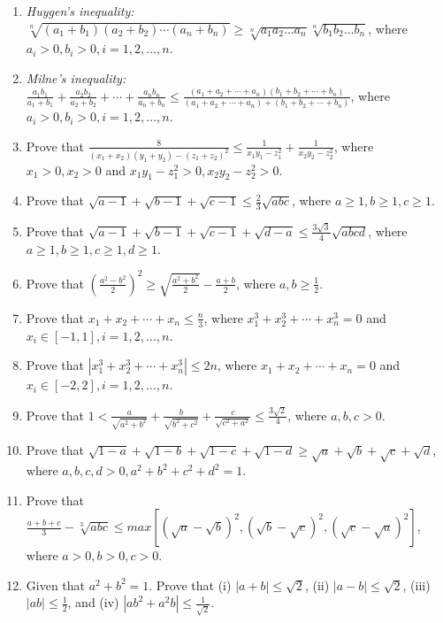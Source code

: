 \begin{enumerate}
\item \textit{Huygen's inequality:} $\sqrt[n]{(a_1 + b_1)(a_2 + b_2)\cdots(a_n + b_n)}\geq \sqrt[n]{a_1a_2\ldots
  a_n}\sqrt[n]{b_1b_2\ldots b_n}$, where $a_i > 0, b_i > 0, i = 1, 2, \ldots, n$.
\item \textit{Milne's inequality:} $\frac{a_1b_1}{a_1 + b_1} + \frac{a_2b_2}{a_2 + b_2} + \cdots + \frac{a_nb_n}{a_n + b_n}\leq
  \frac{(a_1 + a_2 + \cdots + a_n)(b_1 + b_2 + \cdots + b_n)}{(a_1 + a_2 + \cdots + a_n) + (b_1 + b_2 + \cdots + b_n)}$, where $a_i
  > 0, b_i > 0, i = 1, 2, \ldots, n$.
\item Prove that $\frac{8}{(x_1 + x_2)(y_1 + y_2) - (z_1 + z_2)^2} \leq \frac{1}{x_1y_1 - z_1^2} + \frac{1}{x_2y_2 - z_2^2}$, where
  $x_1 > 0, x_2 > 0$ and $x_1y_1 - z_1^2 > 0, x_2y_2 - z_2^2 > 0$.
\item Prove that $\sqrt{a - 1} + \sqrt{b - 1} + \sqrt{c - 1} \leq \frac{2}{3}\sqrt{abc}$, where $a\geq 1, b\geq 1, c\geq 1$.
\item Prove that $\sqrt{a - 1} + \sqrt{b - 1} + \sqrt{c - 1} + \sqrt{d - a}\leq \frac{3\sqrt{3}}{4}\sqrt{abcd}$, where $a\geq 1,
  b\geq 1, c\geq 1, d\geq 1$.
\item Prove that $\left(\frac{a^2 - b^2}{2}\right)^2 \geq \sqrt{\frac{a^2 + b^2}{2}} - \frac{a + b}{2}$, where $a, b\geq
  \frac{1}{2}$.
\item Prove that $x_1 + x_2 + \cdots + x_n \leq \frac{n}{3}$, where $x_1^3 + x_2^3 + \cdots + x_n^3 = 0$ and $x_i\in[-1, 1], i = 1,
  2, \ldots, n$.
\item Prove that $|x_1^3 + x_2^3 + \cdots + x_n^3|\leq 2n$, where $x_1 + x_2 + \cdots + x_n = 0$ and $x_i\in [-2, 2], i = 1, 2,
  \ldots, n$.
\item Prove that $1 < \frac{a}{\sqrt{a^2 + b^2}} + \frac{b}{\sqrt{b^2 + c^2}} + \frac{c}{\sqrt{c^2 + a^2}}\leq
  \frac{3\sqrt{2}}{4}$, where $a, b, c > 0$.
\item Prove that $\sqrt{1 - a} + \sqrt{1 - b} + \sqrt{1 - c} + \sqrt{1 - d}\geq \sqrt{a} + \sqrt{b} + \sqrt{c} + \sqrt{d}$, where
  $a, b, c, d > 0, a^2 + b^2 + c^2 + d^2 = 1$.
\item Prove that $\frac{a + b + c}{3} - \sqrt[3]{abc}\leq max\left[\left(\sqrt{a} - \sqrt{b}\right)^2, \left(\sqrt{b} -
  \sqrt{c}\right)^2, \left(\sqrt{c} - \sqrt{a}\right)^2\right]$, where $a > 0, b > 0, c > 0$.
\item Given that $a^2 + b^2 = 1$. Prove that (i) $|a + b|\leq \sqrt{2}$, (ii) $|a - b|\leq \sqrt{2}$, (iii) $|ab|\leq \frac{1}{2}$,
  and (iv) $|ab^2 + a^2b|\leq \frac{1}{\sqrt{2}}$.

\end{enumerate}

